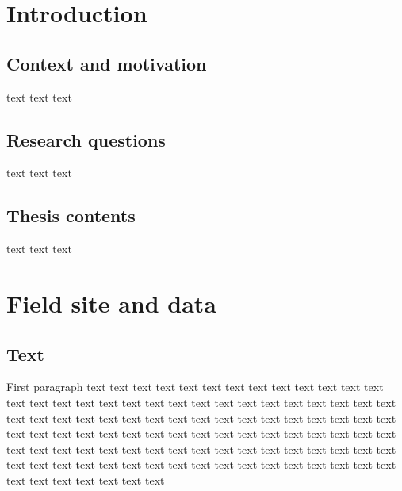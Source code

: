 \documentclass[twocolumn, 10pt, a4paper]{memoir}
\begin{document}
  

\cleardoublepage 

\pagestyle{ruled}
\mainmatter          

\chapter{Introduction}\vspace{-6mm} 
  

\section{Context and motivation}

text text text

\section{Research questions}

text text text

\section{Thesis contents}

text text text







\cleardoublepage
\chapter{Field site and data}\vspace{-6mm} 
\label{ch: field}

\section{Text}

First paragraph 
text text text text text text text text text text text text text text text text text text text text text
text text text text text text text text text text text text text text text text text text text text text
text text text text text text text text text text text text text text text text text text text text text
text text text text text text text text text text text text text text text text text text text text text
text text text text text text text text text text text text text text text text text text text text text
\end{document}

